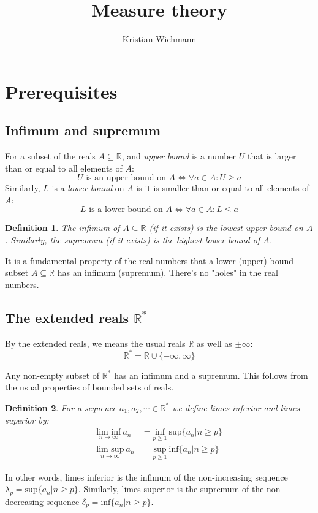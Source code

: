 \documentclass[12pt, a4paper]{article}
\title{Measure theory}
\author{Kristian Wichmann}
\newtheorem{definition}{Definition}[section]
\numberwithin{equation}{section}
\begin{document}
\maketitle

\section{Prerequisites}

\subsection{Infimum and supremum}
For a subset of the reals $A\subseteq\mathbb{R}$, and \textit{upper bound} is a number $U$ that is larger than or equal to all elements of $A$:
\begin{equation}
U\textrm{ is an upper bound on }A\Leftrightarrow\forall a\in A: U\ge a
\end{equation}
Similarly, $L$ is a \textit{lower bound} on $A$ is it is smaller than or equal to all elements of $A$:
\begin{equation}
L\textrm{ is a lower bound on }A\Leftrightarrow\forall a\in A: L\le a
\end{equation}
\begin{definition}
The \textit{infimum} of $A\subseteq\mathbb{R}$ (if it exists) is the lowest upper bound on $A$. Similarly, the \textit{supremum} (if it exists) is the highest lower bound of $A$.
\end{definition}
It is a fundamental property of the real numbers that a lower (upper) bound subset $A\subseteq\mathbb{R}$ has an infimum (supremum). There's no "holes" in the real numbers.

\subsection{The extended reals $\mathbb{R}^*$}
By the extended reals, we means the usual reals $\mathbb{R}$ as well as $\pm\infty$:
\begin{equation}
\mathbb{R}^*=\mathbb{R}\cup\{-\infty,\infty\}
\end{equation} 

Any non-empty subset of $\mathbb{R}^*$ has an infimum and a supremum. This follows from the usual properties of bounded sets of reals.

\begin{definition}
For a sequence $a_1,a_2,\cdots\in\mathbb{R}^*$ we define \textit{limes inferior} and \textit{limes superior} by:
\begin{align}
\underset{n\rightarrow\infty}{\textrm{lim inf}}\ a_n&=\underset{p\ge 1}{\textrm{inf}}\ \textrm{sup}\{a_n|n\ge p\}\\
\underset{n\rightarrow\infty}{\textrm{lim sup}}\ a_n&=\underset{p\ge 1}{\textrm{sup}}\ \textrm{inf}\{a_n|n\ge p\}
\end{align}
\end{definition}
In other words, limes inferior is the infimum of the non-increasing sequence $\lambda_p=\textrm{sup}\{a_n|n\ge p\}$. Similarly, limes superior is the supremum of the non-decreasing sequence $\delta_p=\textrm{inf}\{a_n|n\ge p\}$.
\end{document}
